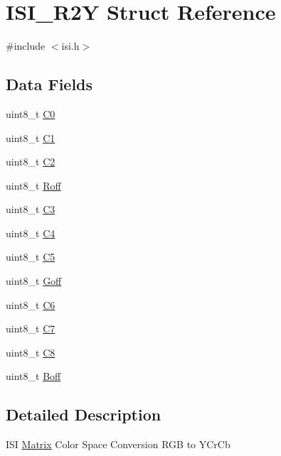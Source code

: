 \hypertarget{structISI__R2Y}{}\section{I\+S\+I\+\_\+\+R2Y Struct Reference}
\label{structISI__R2Y}


{\ttfamily \#include $<$isi.\+h$>$}

\subsection*{Data Fields}
\begin{DoxyCompactItemize}
\item 
uint8\+\_\+t \mbox{\hyperlink{structISI__R2Y_a7366acddeb1743d0df811516f4c0ef90}{C0}}
\item 
uint8\+\_\+t \mbox{\hyperlink{structISI__R2Y_a85e4e58d5f760877816cab069b80c217}{C1}}
\item 
uint8\+\_\+t \mbox{\hyperlink{structISI__R2Y_a7534325e6788edd0b70f69fbcd0f020a}{C2}}
\item 
uint8\+\_\+t \mbox{\hyperlink{structISI__R2Y_a97f211a83ababec03f30610fbfb8c067}{Roff}}
\item 
uint8\+\_\+t \mbox{\hyperlink{structISI__R2Y_abb41a33da5b3993c0f8724349ba46454}{C3}}
\item 
uint8\+\_\+t \mbox{\hyperlink{structISI__R2Y_a98325a6c66a6c93e6bdb19d878584dd2}{C4}}
\item 
uint8\+\_\+t \mbox{\hyperlink{structISI__R2Y_a3b190bfa1868d69369d2a58a6d20019b}{C5}}
\item 
uint8\+\_\+t \mbox{\hyperlink{structISI__R2Y_a1edcefe437bdb5d617a47049f4c96994}{Goff}}
\item 
uint8\+\_\+t \mbox{\hyperlink{structISI__R2Y_a4d1fffa637b855f879d7ec5a7489675c}{C6}}
\item 
uint8\+\_\+t \mbox{\hyperlink{structISI__R2Y_ab557b6eb689bd7ba0a340358074e59e7}{C7}}
\item 
uint8\+\_\+t \mbox{\hyperlink{structISI__R2Y_a237e6f569066550bff5a6ebd8f8abb6e}{C8}}
\item 
uint8\+\_\+t \mbox{\hyperlink{structISI__R2Y_a8191603ccb2a2a126638cbd0216f874d}{Boff}}
\end{DoxyCompactItemize}


\subsection{Detailed Description}
I\+SI \mbox{\hyperlink{structMatrix}{Matrix}} Color Space Conversion R\+GB to Y\+Cr\+Cb 

